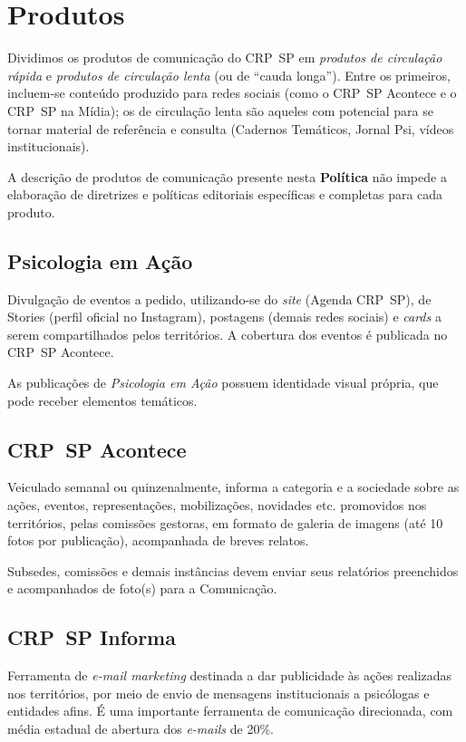 \section{Produtos}

Dividimos os produtos de comunicação do CRP~SP em \emph{produtos de
  circulação rápida} e \emph{produtos de circulação lenta} (ou de ``cauda
longa''). Entre os primeiros, incluem-se conteúdo produzido para redes
sociais (como o CRP~SP Acontece e o CRP~SP na Mídia); os de circulação
lenta são aqueles com potencial para se tornar material de referência e
consulta (Cadernos Temáticos, Jornal Psi, vídeos institucionais).

A descrição de produtos de comunicação presente nesta \textbf{Política}
não impede a elaboração de diretrizes e políticas editoriais específicas
e completas para cada produto.

\subsection{Psicologia em Ação}

Divulgação de eventos a pedido, utilizando-se do \emph{site} (Agenda
CRP~SP), de Stories (perfil oficial no Instagram), postagens (demais
redes sociais) e \emph{cards} a serem compartilhados pelos territórios.
A cobertura dos eventos é publicada no CRP~SP Acontece.

As publicações de \emph{Psicologia em Ação} possuem identidade visual
própria, que pode receber elementos temáticos.

\subsection{CRP~SP Acontece}

Veiculado semanal ou quinzenalmente, informa a categoria e a sociedade
sobre as ações, eventos, representações, mobilizações, novidades etc.
promovidos nos territórios, pelas comissões gestoras, em formato de
galeria de imagens (até 10 fotos por publicação), acompanhada de breves
relatos.

Subsedes, comissões e demais instâncias devem enviar seus relatórios
preenchidos e acompanhados de foto(s) para a Comunicação.

\subsection{CRP~SP Informa}

Ferramenta de \emph{e-mail marketing} destinada a dar publicidade às
ações realizadas nos territórios, por meio de envio de mensagens
institucionais a psicólogas e entidades afins. É uma importante
ferramenta de comunicação direcionada, com média estadual de abertura
dos \emph{e-mails} de 20\%.

